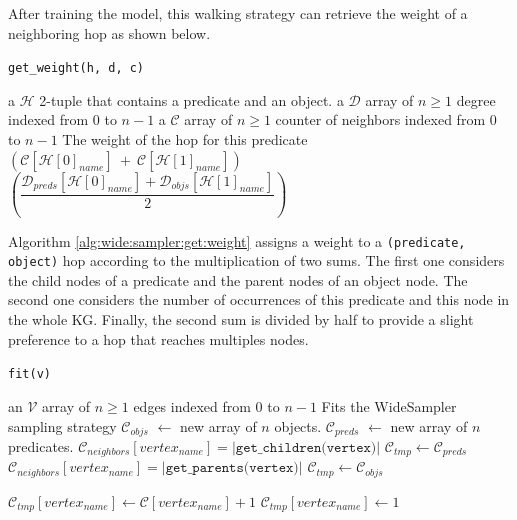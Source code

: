 After training the model, this walking strategy can retrieve the weight of a
neighboring hop as shown below.
\begin{algorithm}
  \caption{\texttt{get\_weight(h, d, c)}}
  \label{alg:wide:sampler:get:weight}
  \begin{algorithmic}[1]
    \REQUIRE a $\mathcal{H}$ 2-tuple that contains a predicate and an object.
    \REQUIRE a $\mathcal{D}$ array of $n \geq 1$ degree indexed from $0$ to $n - 1$
    \REQUIRE a $\mathcal{C}$ array of $n \geq 1$ counter of neighbors indexed from $0$ to $n - 1$
    \ENSURE The weight of the hop for this predicate
    \RETURN $\left(\mathcal{C}[\mathcal{H}[0]_{name}]\ +\ \mathcal{C}[\mathcal{H}[1]_{name}]\right)$ $\left(\dfrac{\mathcal{D}_{preds}[\mathcal{H}[0]_{name}] + \mathcal{D}_{objs}[\mathcal{H}[1]_{name}]}{2}\right)$
    \ENDIF
  \end{algorithmic}
\end{algorithm}

Algorithm \ref{alg:wide:sampler:get:weight} assigns a weight to a
\texttt{(predicate, object)} hop according to the multiplication of two
sums. The first one considers the child nodes of a predicate and the parent
nodes of an object node. The second one considers the number of occurrences of
this predicate and this node in the whole KG. Finally, the second sum is divided
by half to provide a slight preference to a hop that reaches multiples nodes.

\newpage

\begin{algorithm}
  \caption{\texttt{fit(v)}}
  \label{alg:wide:sampler:fit}
  \begin{algorithmic}[1]
    \REQUIRE an $\mathcal{V}$ array of $n \geq 1$ edges indexed from $0$ to $n - 1$
    \ENSURE Fits the WideSampler sampling strategy
    \STATE $\mathcal{C}_{objs}$ $\leftarrow$ new array of $n$ objects.
    \STATE $\mathcal{C}_{preds}$ $\leftarrow$ new array of $n$ predicates.
    \STATE $\mathcal{C}_{neighbors}[vertex_{name}] = |\texttt{get\_children(vertex)}|$
    \STATE $\mathcal{C}_{tmp} \leftarrow \mathcal{C}_{preds}$
    \ELSE
    \STATE $\mathcal{C}_{neighbors}[vertex_{name}] = |\texttt{get\_parents(vertex)}|$
    \STATE $\mathcal{C}_{tmp} \leftarrow \mathcal{C}_{objs}$
    \ENDIF

    \STATE $\mathcal{C}_{tmp}[vertex_{name}] \leftarrow \mathcal{C}[vertex_{name}] + 1$
    \ELSE
    \STATE $\mathcal{C}_{tmp}[vertex_{name}] \leftarrow 1$
    \ENDIF
    \ENDFOR
  \end{algorithmic}
\end{algorithm}

